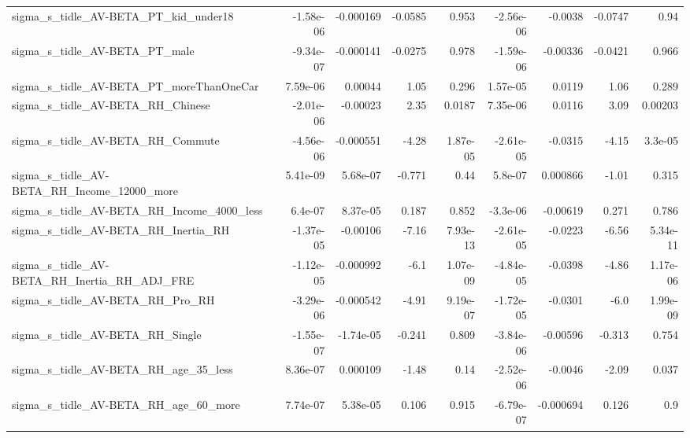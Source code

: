 \begin{tabular}{lrrrrrrrr}
sigma\_s\_tidle\_AV-BETA\_PT\_kid\_under18               &   -1.58e-06 &    -0.000169 &  -0.0585 &    0.953 &  -2.56e-06 &     -0.0038 &      -0.0747 &          0.94 \\
sigma\_s\_tidle\_AV-BETA\_PT\_male                      &   -9.34e-07 &    -0.000141 &  -0.0275 &    0.978 &  -1.59e-06 &    -0.00336 &      -0.0421 &         0.966 \\
sigma\_s\_tidle\_AV-BETA\_PT\_moreThanOneCar            &    7.59e-06 &      0.00044 &     1.05 &    0.296 &   1.57e-05 &      0.0119 &         1.06 &         0.289 \\
sigma\_s\_tidle\_AV-BETA\_RH\_Chinese                   &   -2.01e-06 &     -0.00023 &     2.35 &   0.0187 &   7.35e-06 &      0.0116 &         3.09 &       0.00203 \\
sigma\_s\_tidle\_AV-BETA\_RH\_Commute                   &   -4.56e-06 &    -0.000551 &    -4.28 & 1.87e-05 &  -2.61e-05 &     -0.0315 &        -4.15 &       3.3e-05 \\
sigma\_s\_tidle\_AV-BETA\_RH\_Income\_12000\_more         &    5.41e-09 &     5.68e-07 &   -0.771 &     0.44 &    5.8e-07 &    0.000866 &        -1.01 &         0.315 \\
sigma\_s\_tidle\_AV-BETA\_RH\_Income\_4000\_less          &     6.4e-07 &     8.37e-05 &    0.187 &    0.852 &   -3.3e-06 &    -0.00619 &        0.271 &         0.786 \\
sigma\_s\_tidle\_AV-BETA\_RH\_Inertia\_RH                &   -1.37e-05 &     -0.00106 &    -7.16 & 7.93e-13 &  -2.61e-05 &     -0.0223 &        -6.56 &      5.34e-11 \\
sigma\_s\_tidle\_AV-BETA\_RH\_Inertia\_RH\_ADJ\_FRE        &   -1.12e-05 &    -0.000992 &     -6.1 & 1.07e-09 &  -4.84e-05 &     -0.0398 &        -4.86 &      1.17e-06 \\
sigma\_s\_tidle\_AV-BETA\_RH\_Pro\_RH                    &   -3.29e-06 &    -0.000542 &    -4.91 & 9.19e-07 &  -1.72e-05 &     -0.0301 &         -6.0 &      1.99e-09 \\
sigma\_s\_tidle\_AV-BETA\_RH\_Single                    &   -1.55e-07 &    -1.74e-05 &   -0.241 &    0.809 &  -3.84e-06 &    -0.00596 &       -0.313 &         0.754 \\
sigma\_s\_tidle\_AV-BETA\_RH\_age\_35\_less               &    8.36e-07 &     0.000109 &    -1.48 &     0.14 &  -2.52e-06 &     -0.0046 &        -2.09 &         0.037 \\
sigma\_s\_tidle\_AV-BETA\_RH\_age\_60\_more               &    7.74e-07 &     5.38e-05 &    0.106 &    0.915 &  -6.79e-07 &   -0.000694 &        0.126 &           0.9 \\

\end{tabular}
